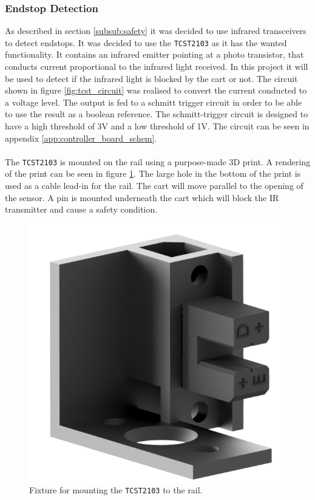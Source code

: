 



\subsubsection{Endstop Detection} %
\label{ssub:endstop_detection}
As described in section \ref{subsub:safety} it was decided to use infrared transceivers to detect endstops.
It was decided to use the \texttt{TCST2103} \cite{tcst2103} as it has the wanted functionality.
It contains an infrared emitter pointing at a photo transistor, that conducts current proportional to the infrared light received.
In this project it will be used to detect if the infrared light is blocked by the cart or not. 
The circuit shown in figure \ref{fig:tcst_circuit} was realised to convert the current conducted to a voltage level. 
The output is fed to a schmitt trigger circuit in order to be able to use the result as a boolean reference.
The schmitt-trigger circuit is designed to have a high threshold of 3V and a low threshold of 1V.
The circuit can be seen in appendix \ref{app:controller_board_schem}.
\\~\\
The \texttt{TCST2103} is mounted on the rail using a purpose-made 3D print.
A rendering of the print can be seen in figure \ref{fig:endstop}.
The large hole in the bottom of the print is used as a cable lead-in for the rail.
The cart will move parallel to the opening of the sensor.
A pin is mounted underneath the cart which will block the IR transmitter and cause a safety condition.

\begin{figure}[h]
	\centering
	\includegraphics[width=.5\linewidth]{graphics/endstop}
	\caption{Fixture for mounting the \texttt{TCST2103} to the rail.}
	\label{fig:endstop}
\end{figure}

